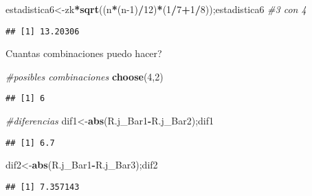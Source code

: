 \documentclass[
]{article}
\newenvironment{Shaded}{\begin{snugshade}}{\end{snugshade}}
\newcommand{\CommentTok}[1]{\textcolor[rgb]{0.56,0.35,0.01}{\textit{#1}}}
\newcommand{\DecValTok}[1]{\textcolor[rgb]{0.00,0.00,0.81}{#1}}
\newcommand{\FunctionTok}[1]{\textcolor[rgb]{0.13,0.29,0.53}{\textbf{#1}}}
\newcommand{\NormalTok}[1]{#1}
\newcommand{\OtherTok}[1]{\textcolor[rgb]{0.56,0.35,0.01}{#1}}
\newcommand{\SpecialCharTok}[1]{\textcolor[rgb]{0.81,0.36,0.00}{\textbf{#1}}}
\begin{document}
\begin{Shaded}
\begin{Highlighting}[]
\NormalTok{estadistica6}\OtherTok{\textless{}{-}}\NormalTok{zk}\SpecialCharTok{*}\FunctionTok{sqrt}\NormalTok{((n}\SpecialCharTok{*}\NormalTok{(n}\DecValTok{{-}1}\NormalTok{)}\SpecialCharTok{/}\DecValTok{12}\NormalTok{)}\SpecialCharTok{*}\NormalTok{(}\DecValTok{1}\SpecialCharTok{/}\DecValTok{7}\SpecialCharTok{+}\DecValTok{1}\SpecialCharTok{/}\DecValTok{8}\NormalTok{));estadistica6  }\CommentTok{\#3 con 4}
\end{Highlighting}
\end{Shaded}

\begin{verbatim}
## [1] 13.20306
\end{verbatim}

Cuantas combinaciones puedo hacer?

\begin{Shaded}
\begin{Highlighting}[]
\CommentTok{\#posibles combinaciones}
\FunctionTok{choose}\NormalTok{(}\DecValTok{4}\NormalTok{,}\DecValTok{2}\NormalTok{)}
\end{Highlighting}
\end{Shaded}

\begin{verbatim}
## [1] 6
\end{verbatim}

\begin{Shaded}
\begin{Highlighting}[]
\CommentTok{\#diferencias}
\NormalTok{dif1}\OtherTok{\textless{}{-}}\FunctionTok{abs}\NormalTok{(R.j\_Bar1}\SpecialCharTok{{-}}\NormalTok{R.j\_Bar2);dif1}
\end{Highlighting}
\end{Shaded}

\begin{verbatim}
## [1] 6.7
\end{verbatim}

\begin{Shaded}
\begin{Highlighting}[]
\NormalTok{dif2}\OtherTok{\textless{}{-}}\FunctionTok{abs}\NormalTok{(R.j\_Bar1}\SpecialCharTok{{-}}\NormalTok{R.j\_Bar3);dif2}
\end{Highlighting}
\end{Shaded}

\begin{verbatim}
## [1] 7.357143
\end{verbatim}
\end{document}

